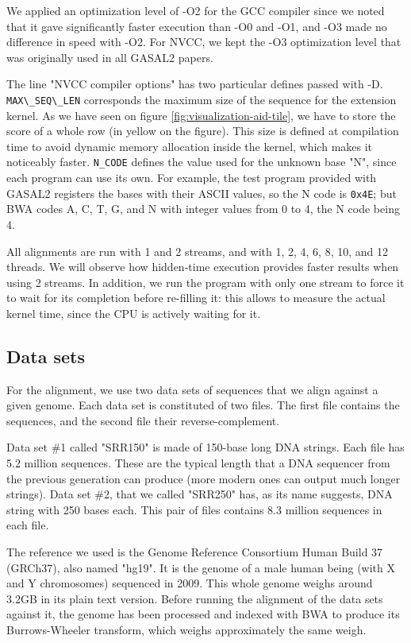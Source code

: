 We applied an optimization level of -O2 for the GCC compiler since we noted that it gave significantly faster execution than -O0 and -O1, and -O3 made no difference in speed with -O2. For NVCC, we kept the -O3 optimization level that was originally used in all GASAL2 papers\cite{Ahmed:gasal}.

The line "NVCC compiler options" has two particular defines passed with -D. \verb|MAX\_SEQ\_LEN| corresponds the maximum size of the sequence for the extension kernel. As we have seen on figure \ref{fig:visualization-aid-tile}, we have to store the score of a whole row (in yellow on the figure). This size is defined at compilation time to avoid dynamic memory allocation inside the kernel, which makes it noticeably faster. \verb|N_CODE| defines the value used for the unknown base "N", since each program can use its own. For example, the test program provided with GASAL2 registers the bases with their ASCII values, so the N code is \verb|0x4E|; but BWA codes A, C, T, G, and N with integer values from 0 to 4, the N code being 4.

All alignments are run with 1 and 2 streams, and with 1, 2, 4, 6, 8, 10, and 12 threads. We will observe how hidden-time execution provides faster results when using 2 streams. In addition, we run the program with only one stream to force it to wait for its completion before re-filling it: this allows to measure the actual kernel time, since the CPU is actively waiting for it. 

\subsection{Data sets}

For the alignment, we use two data sets of sequences that we align against a given genome. Each data set is constituted of two files. The first file contains the sequences, and the second file their reverse-complement. 

Data set \#1 called "SRR150" is made of 150-base long DNA strings. Each file has 5.2 million sequences. These are the typical length that a DNA sequencer from the previous generation can produce (more modern ones can output much longer strings). Data set \#2, that we called "SRR250" has, as its name suggests, DNA string with 250 bases each. This pair of files contains 8.3 million sequences in each file.

The reference we used is the Genome Reference Consortium Human Build 37 (GRCh37), also named "hg19"\cite{ncbi:hg19}. It is the genome of a male human being (with X and Y chromosomes) sequenced in 2009. This whole genome weighs around 3.2GB in its plain text version. Before running the alignment of the data sets against it, the genome has been processed and indexed with BWA to produce its Burrows-Wheeler transform, which weighs approximately the same weigh.

